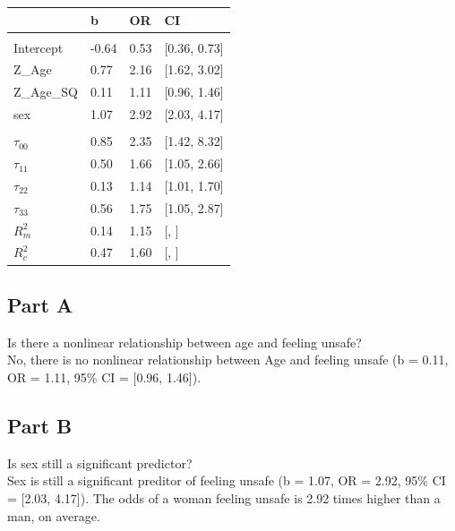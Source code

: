\documentclass[]{article}
\begin{document}
\begin{table}[H]
\centering
\begin{tabular}{llll}
\toprule
 & b & OR & CI\\
\midrule
\addlinespace[0.3em]
\multicolumn{4}{l}{\textbf{Fixed}}\\
\hspace{1em}Intercept & -0.64 & 0.53 & [0.36, 0.73]\\
\hspace{1em}Z\_Age & 0.77 & 2.16 & [1.62, 3.02]\\
\hspace{1em}Z\_Age\_SQ & 0.11 & 1.11 & [0.96, 1.46]\\
\hspace{1em}sex & 1.07 & 2.92 & [2.03, 4.17]\\
\addlinespace[0.3em]
\multicolumn{4}{l}{\textbf{Random}}\\
\hspace{1em}$\tau_{00}$ & 0.85 & 2.35 & [1.42, 8.32]\\
\hspace{1em}$\tau_{11}$ & 0.50 & 1.66 & [1.05, 2.66]\\
\hspace{1em}$\tau_{22}$ & 0.13 & 1.14 & [1.01, 1.70]\\
\hspace{1em}$\tau_{33}$ & 0.56 & 1.75 & [1.05, 2.87]\\
$R^2_m$ & 0.14 & 1.15 & [, ]\\
$R^2_c$ & 0.47 & 1.60 & [, ]\\
\bottomrule
\end{tabular}
\end{table}

\subsection{Part A}\label{part-a}

Is there a nonlinear relationship between age and feeling unsafe?\\
No, there is no nonlinear relationship between Age and feeling unsafe
(b = 0.11, OR = 1.11, 95\% CI = {[}0.96, 1.46{]}).

\subsection{Part B}\label{part-b}

Is sex still a significant predictor?\\
Sex is still a significant preditor of feeling unsafe (b = 1.07, OR =
2.92, 95\% CI = {[}2.03, 4.17{]}). The odds of a woman feeling unsafe is
2.92 times higher than a man, on average.
\end{document}
